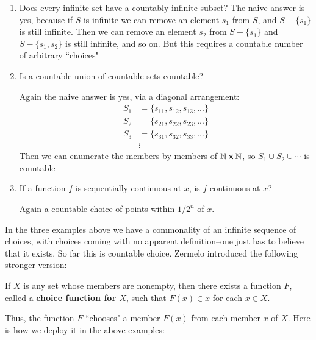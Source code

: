 \documentclass[12pt, a4paper, oneside, openright, titlepage]{book}
\begin{document}
\begin{enumerate}
    \item Does every infinite set have a countably infinite subset?
        The naive answer is yes, because if $S$ is infinite we can remove an element $s_1$ from $S$, and $S-\{s_1\}$ is still infinite. Then we can remove an element $s_2$ from $S-\{s_1\}$ and $S-\{s_1,s_2\}$ is still infinite, and so on. But this requires a countable number of arbitrary ``choices"
    \item Is a countable union of countable sets countable?

        Again the naive answer is yes, via a diagonal arrangement: \begin{align*}
            S_1 &= \{s_{11},s_{12},s_{13},...\} \\
            S_2 &= \{s_{21},s_{22},s_{23},...\} \\
            S_3 &= \{s_{31},s_{32},s_{33},...\}  \\
            &\vdots
        \end{align*}
        Then we can enumerate the members by members of $\mathbb N\times \mathbb N$, so $S_1\cup S_2\cup \cdots $ is countable
    \item If a function $f$ is sequentially continuous at $x$, is $f$ continuous at $x$?

        Again a countable choice of points within $1/2^n$ of $x$.
\end{enumerate}

In the three examples above we have a commonality of an infinite sequence of choices, with choices coming with no apparent definition\---one just has to believe that it exists. So far this is countable choice. Zermelo introduced the following stronger version:

\begin{defn}
    If $X$ is any set whose members are nonempty, then there exists a function $F$, called a \textbf{choice function for $X$}, such that $F(x) \in x$ for each $x \in X$.
\end{defn}

Thus, the function $F$ ``chooses" a member $F(x)$ from each member $x$ of $X$. Here is how we deploy it in the above examples:
\end{document}
